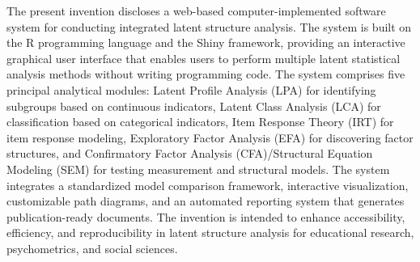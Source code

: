 \documentclass[12pt,a4paper]{article}
\begin{document}
The present invention discloses a web-based computer-implemented software system for conducting integrated latent structure analysis. The system is built on the R programming language and the Shiny framework, providing an interactive graphical user interface that enables users to perform multiple latent statistical analysis methods without writing programming code. The system comprises five principal analytical modules: Latent Profile Analysis (LPA) for identifying subgroups based on continuous indicators, Latent Class Analysis (LCA) for classification based on categorical indicators, Item Response Theory (IRT) for item response modeling, Exploratory Factor Analysis (EFA) for discovering factor structures, and Confirmatory Factor Analysis (CFA)/Structural Equation Modeling (SEM) for testing measurement and structural models. The system integrates a standardized model comparison framework, interactive visualization, customizable path diagrams, and an automated reporting system that generates publication-ready documents. The invention is intended to enhance accessibility, efficiency, and reproducibility in latent structure analysis for educational research, psychometrics, and social sciences.
\end{document}
